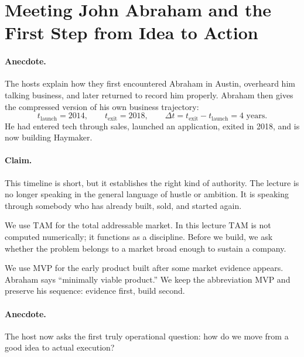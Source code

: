\section{Meeting John Abraham and the First Step from Idea to Action}

\paragraph{Anecdote.} The hosts explain how they first encountered Abraham in Austin, overheard him talking business, and later returned to record him properly. Abraham then gives the compressed version of his own business trajectory:
\begin{equation}
t_{\text{launch}} = 2014,
\qquad
t_{\text{exit}} = 2018,
\qquad
\Delta t = t_{\text{exit}} - t_{\text{launch}} = 4 \text{ years}.
\end{equation}
He had entered tech through sales, launched an application, exited in 2018, and is now building Haymaker.

\paragraph{Claim.} This timeline is short, but it establishes the right kind of authority. The lecture is no longer speaking in the general language of hustle or ambition. It is speaking through somebody who has already built, sold, and started again.

\begin{definition}
We use \(\mathrm{TAM}\) for the total addressable market. In this lecture \(\mathrm{TAM}\) is not computed numerically; it functions as a discipline. Before we build, we ask whether the problem belongs to a market broad enough to sustain a company.
\end{definition}

\begin{definition}
We use \(\mathrm{MVP}\) for the early product built after some market evidence appears. Abraham says ``minimally viable product.'' We keep the abbreviation \(\mathrm{MVP}\) and preserve his sequence: evidence first, build second.
\end{definition}

\paragraph{Anecdote.} The host now asks the first truly operational question: how do we move from a good idea to actual execution?

